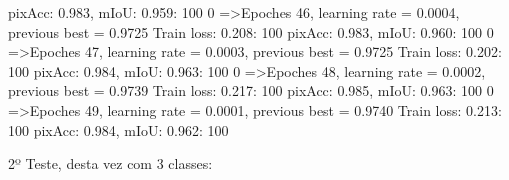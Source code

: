 pixAcc: 0.983, mIoU: 0.959: 100%
  0%
=>Epoches 46, learning rate = 0.0004,                 previous best = 0.9725
Train loss: 0.208: 100%
pixAcc: 0.983, mIoU: 0.960: 100%
  0%
=>Epoches 47, learning rate = 0.0003,                 previous best = 0.9725
Train loss: 0.202: 100%
pixAcc: 0.984, mIoU: 0.963: 100%
  0%
=>Epoches 48, learning rate = 0.0002,                 previous best = 0.9739
Train loss: 0.217: 100%
pixAcc: 0.985, mIoU: 0.963: 100%
  0%
=>Epoches 49, learning rate = 0.0001,                 previous best = 0.9740
Train loss: 0.213: 100%
pixAcc: 0.984, mIoU: 0.962: 100%

    
    
    
    
2º Teste, desta vez com 3 classes:

